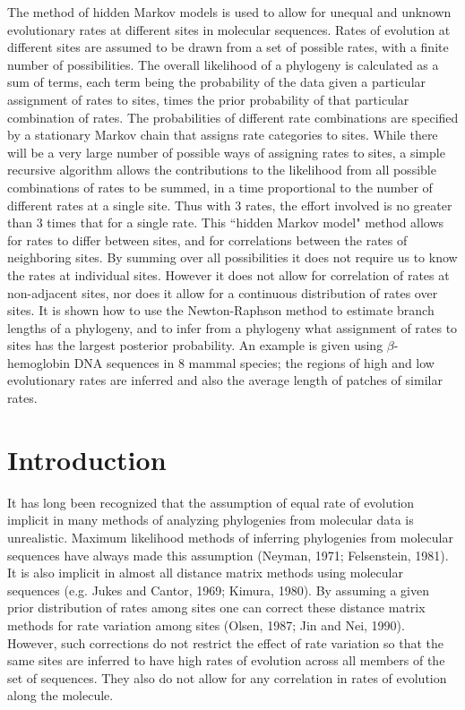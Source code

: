 \documentclass[12pt]{article}
\begin{document}
The method of hidden Markov models is used to allow for unequal and unknown
evolutionary rates at different sites in molecular sequences.  Rates of
evolution at different sites are assumed to be drawn from a set of possible
rates, with a finite number of possibilities.  The overall likelihood of a
phylogeny is calculated as a sum of terms, each term being the probability
of the data given a particular assignment of rates to sites, times the
prior probability of that particular combination of rates.  The probabilities
of different rate combinations are specified by a stationary Markov chain that
assigns rate categories to sites.  While there will be a very large number
of possible ways of assigning rates to sites, a simple recursive algorithm
allows the contributions to the likelihood from all possible combinations of
rates to be summed, in a time proportional to the number of different rates
at a single site.  Thus with 3 rates, the effort involved is no greater than
3 times that for a single rate.  This ``hidden Markov model" method allows for
rates to differ between sites, and for correlations between the rates of
neighboring sites.  By summing over all possibilities it does not require
us to know the rates at individual sites.  However it does not allow for
correlation of rates at non-adjacent sites, nor does it allow for a
continuous distribution of rates over sites.  It is shown how to use the
Newton-Raphson method to estimate branch lengths of a phylogeny, and to infer
from a phylogeny what assignment of rates to sites has the largest posterior
probability.  An example is given using $\beta$-hemoglobin DNA sequences
in 8 mammal species; the regions of high and low evolutionary rates are
inferred and also the average length of patches of similar rates.

\newpage

\section*{Introduction}

It has long been recognized that the assumption of equal rate of
evolution implicit in many methods of analyzing phylogenies from
molecular data is unrealistic.  Maximum likelihood methods of
inferring phylogenies from molecular sequences have always made this
assumption (Neyman, 1971; Felsenstein, 1981).   It is also implicit
in almost all distance matrix methods using molecular sequences
(e.g. Jukes and Cantor, 1969; Kimura, 1980).  By assuming a given
prior distribution of rates among sites one can correct these
distance matrix methods for rate variation among sites (Olsen, 1987;
Jin and Nei, 1990).  However, such corrections do not
restrict the effect of rate variation so that the same sites are
inferred to have high rates of evolution across all members of the
set of sequences.  They also do not allow for any
correlation in rates of evolution along the molecule.
\end{document}

